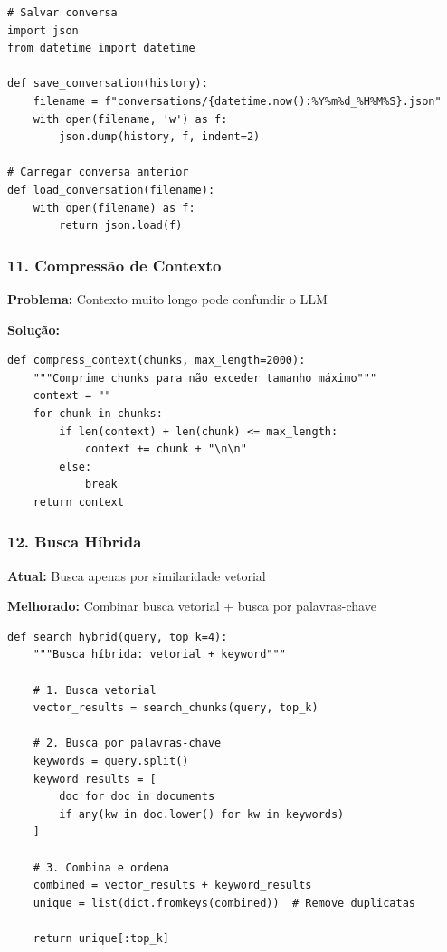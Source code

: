 \documentclass[12pt,a4paper]{article}
\begin{document}
\begin{lstlisting}
# Salvar conversa
import json
from datetime import datetime

def save_conversation(history):
    filename = f"conversations/{datetime.now():%Y%m%d_%H%M%S}.json"
    with open(filename, 'w') as f:
        json.dump(history, f, indent=2)

# Carregar conversa anterior
def load_conversation(filename):
    with open(filename) as f:
        return json.load(f)
\end{lstlisting}

\subsubsection{11. Compressão de Contexto}

\textbf{Problema:} Contexto muito longo pode confundir o LLM

\textbf{Solução:}

\begin{lstlisting}
def compress_context(chunks, max_length=2000):
    """Comprime chunks para não exceder tamanho máximo"""
    context = ""
    for chunk in chunks:
        if len(context) + len(chunk) <= max_length:
            context += chunk + "\n\n"
        else:
            break
    return context
\end{lstlisting}

\subsubsection{12. Busca Híbrida}

\textbf{Atual:} Busca apenas por similaridade vetorial

\textbf{Melhorado:} Combinar busca vetorial + busca por palavras-chave

\begin{lstlisting}
def search_hybrid(query, top_k=4):
    """Busca híbrida: vetorial + keyword"""
    
    # 1. Busca vetorial
    vector_results = search_chunks(query, top_k)
    
    # 2. Busca por palavras-chave
    keywords = query.split()
    keyword_results = [
        doc for doc in documents
        if any(kw in doc.lower() for kw in keywords)
    ]
    
    # 3. Combina e ordena
    combined = vector_results + keyword_results
    unique = list(dict.fromkeys(combined))  # Remove duplicatas
    
    return unique[:top_k]
\end{lstlisting}
\end{document}

